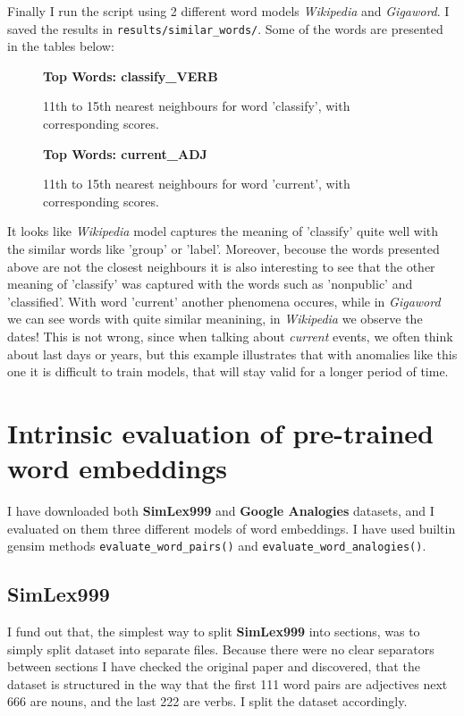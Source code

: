 \documentclass{article}
\begin{document}
Finally I run the script using 2 different word models \textit{Wikipedia} and \textit{Gigaword}. I saved
the results in \lstinline{results/similar_words/}. Some of the words are presented in the tables below:

\begin{figure}[h]	
	\begin{center}
		\textbf{Top Words: classify\_VERB} \par \medskip
		\scalebox{1}{}
		\caption{11th to 15th nearest neighbours for word 'classify', with corresponding scores.}
	\end{center}
\end{figure}

\begin{figure}[h]	
	\begin{center}
		\textbf{Top Words: current\_ADJ} \par \medskip
		\scalebox{1}{}
		\caption{11th to 15th nearest neighbours for word 'current', with corresponding scores.}
	\end{center}
\end{figure}

It looks like \textit{Wikipedia} model captures the meaning of 'classify' quite well with the
similar words like 'group' or 'label'. Moreover, becouse the words presented above 
are not the closest neighbours it is also interesting to see that the other meaning of 'classify' was captured with the words such as 'nonpublic' and 'classified'.
With word 'current' another phenomena occures, while in \textit{Gigaword} we can see words with quite similar meanining,
in \textit{Wikipedia} we observe the dates! This is not wrong, since when talking about \textit{current} events, we often
think about last days or years, but this example illustrates that with anomalies like this one it is difficult to train models, that
will stay valid for a longer period of time.

\section{Intrinsic evaluation of pre-trained word embeddings}
I have downloaded both \textbf{SimLex999} and \textbf{Google Analogies} datasets,
and I evaluated on them three different models of word embeddings. I have used builtin gensim
methods \lstinline{evaluate_word_pairs()} and \lstinline{evaluate_word_analogies()}.

\subsection{SimLex999}
I fund out that, the simplest way to split \textbf{SimLex999} into sections, was to simply split
dataset into separate files. Because there were no clear separators between sections I have checked
the original paper and discovered, that the dataset is structured in the way that the first 111 word pairs
are adjectives next 666 are nouns, and the last 222 are verbs. I split the dataset accordingly.
\end{document}
